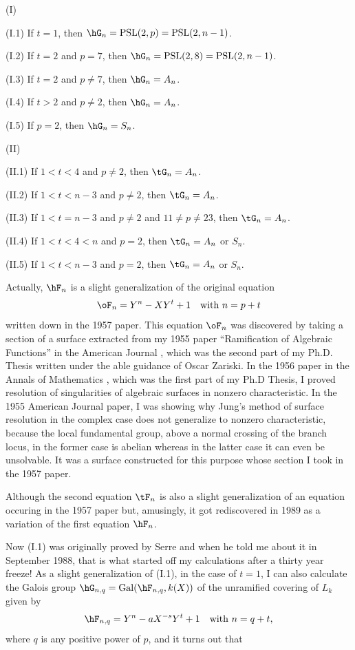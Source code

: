 \heading (I)\endheading

(I.1) If $t=1$, then $\hG_n=\operatorname{PSL}(2,p)=%
\operatorname{PSL}(2,n-1)$.

(I.2) If $t=2$ and $p=7$, then $\hG_n=%
\operatorname{PSL}(2,8)=\operatorname{PSL}(2,n-1)$.

(I.3) If $t=2$ and $p\neq 7$, then $\hG_n=A_n$.

(I.4) If $t>2$ and $p\neq 2$, then $\hG_n=A_n$.

(I.5) If $p=2$, then $\hG_n=S_n$.

\heading (II)\endheading

(II.1) If $1<t<4$ and $p\neq 2$, then $\tG_n=A_n$. 

(II.2) If $1<t<n-3$ and $p\neq 2$, then $\tG_n=A_n$. 

(II.3) If $1<t=n-3$ and $p\neq 2$ and $11\neq p \neq 23$, 
then $\tG_n=A_n$. 

(II.4) If $1<t<4<n$ and $p=2$, then $\tG_n=A_n$ or $S_n$.

(II.5) If $1<t<n-3$ and $p=2$, then $\tG_n=A_n$ or $S_n$.

Actually, $\hF_n$ is a slight generalization of the 
original equation
$$
\oF_n=Y^n-XY^t+1\quad\text{with }n=p+t
$$
written down in the 1957 paper. This equation $\oF_n$ was 
discovered by taking 
a section of a surface extracted from my 1955 paper 
``Ramification of 
Algebraic Functions'' in the American Journal \cite{A1}, 
which was the second 
part of my Ph.D. Thesis written under the able guidance of 
Oscar Zariski. In 
the 1956 paper in the Annals of Mathematics \cite{A2}, 
which  was the first 
part of my Ph.D Thesis, I proved resolution of 
singularities of algebraic 
surfaces in nonzero characteristic. In the 1955 American 
Journal paper, 
I was showing why 
Jung's method of surface resolution in the complex case 
does not generalize
to nonzero characteristic, because the local fundamental 
group, above a normal 
crossing of the branch locus, in the former case is abelian 
whereas in the latter case it can even
be unsolvable. It was a surface constructed for this 
purpose whose section
I took in the 1957 paper.

Although the second equation $\tF_n$ is also a slight 
generalization of an 
equation occuring in the 1957 paper but, amusingly,
it got rediscovered in 1989 as a variation of the first 
equation $\hF_n$. 

Now (I.1) was originally proved by Serre and when he told 
me about it in
September 1988, that is what started off my calculations 
after a thirty
year freeze! As a slight generalization of (I.1), in the 
case of $t=1$, I can 
also calculate the Galois group 
$\hG_{n,q}=\operatorname{Gal}(\hF_{n,q},k(X))$ of 
the unramified covering of $L_k$ given by 
$$
\hF_{n,q}=Y^n-aX^{-s}Y^t+1\quad\text{with }n=q+t,
$$
where $q$ is any positive power of $p$, and it turns out 
that

